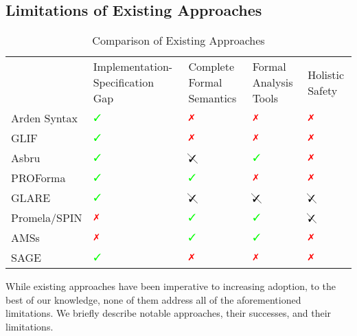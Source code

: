 \subsection{Limitations of Existing Approaches}
\begin{center}
\renewcommand{\arraystretch}{0.5}
  \begin{table}
  \begin{tabularx}{\textwidth}{
      >{\centering\arraybackslash}X
    || >{\centering\arraybackslash}X
    | >{\centering\arraybackslash}X
    | >{\centering\arraybackslash}X
    | >{\centering\arraybackslash}X
  }
                 & Implementation-Specification Gap & Complete Formal Semantics & Formal Analysis Tools & Holistic Safety  \\
    Arden Syntax & $\greencheck$                               & $\redcross$               & $\redcross$           & $\redcross$ \\
    GLIF         & $\greencheck$                               & $\redcross$               & $\redcross$           & $\redcross$ \\
    Asbru        & $\greencheck$                               & $\cancelcheck$            & $\greencheck$         & $\redcross$ \\
    PROForma     & $\greencheck$                               & $\greencheck$             & $\redcross$           & $\redcross$ \\
    GLARE        & $\greencheck$                               & $\cancelcheck$            & $\cancelcheck$        & $\cancelcheck$ \\
    Promela/SPIN & $\redcross$                                 & $\greencheck$             & $\greencheck$         & $\cancelcheck$ \\
    AMSs         & $\redcross$                                 & $\greencheck$             & $\greencheck$         & $\redcross$ \\
    SAGE         & $\greencheck$                               & $\redcross$               & $\redcross$           & $\redcross$ \\
  \end{tabularx}
  \caption{Comparison of Existing Approaches}\label{table:existing-approaches}
  \end{table}
\end{center}

While existing approaches have been imperative to increasing \CGS{} adoption, to the
best of our knowledge, none of them address all of the aforementioned
limitations. We briefly describe notable approaches, their successes, and their limitations.

